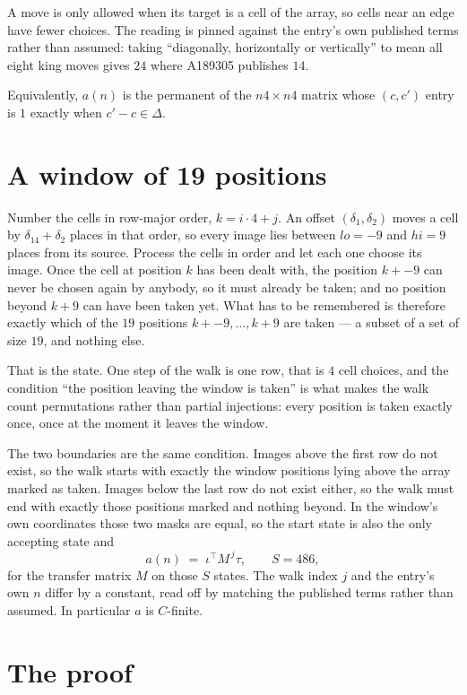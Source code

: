 \documentclass[11pt,a4paper]{article}
\theoremstyle{plain}
\theoremstyle{definition}
\begin{document}
A move is only allowed when its target is a cell of the array, so cells near an
edge have fewer choices. The reading is pinned against the entry's own published terms rather
than assumed: taking ``diagonally, horizontally or vertically'' to mean all eight king moves
gives $24$ where A189305 publishes $14$.

Equivalently, $a(n)$ is the permanent of the $n4\times n4$ matrix whose $(c,c')$ entry is
$1$ exactly when $c'-c\in\Delta$.

\section{A window of 19 positions}

Number the cells in row-major order, $k=i\cdot4+j$. An offset $(\delta_1,\delta_2)$ moves a
cell by $\delta_14+\delta_2$ places in that order, so every image lies between $lo=-9$ and
$hi=9$ places from its source. Process the cells in order and let each one choose its image.
Once the cell at position $k$ has been dealt with, the position $k+-9$ can never be chosen
again by anybody, so it must already be taken; and no position beyond $k+9$ can have been
taken yet. What has to be remembered is therefore exactly which of the $19$ positions
$k+-9,\dots,k+9$ are taken --- a subset of a set of size $19$, and nothing else.

That is the state. One step of the walk is one row, that is $4$ cell choices, and the
condition ``the position leaving the window is taken'' is what makes the walk count permutations
rather than partial injections: every position is taken exactly once, once at the moment it
leaves the window.

The two boundaries are the same condition. Images above the first row do not exist, so the walk
starts with exactly the window positions lying above the array marked as taken. Images below the
last row do not exist either, so the walk must end with exactly those positions marked and
nothing beyond. In the window's own coordinates those two masks are equal, so the start state is
also the only accepting state and
\[
a(n)\;=\;\iota^{\!\top}M^{\,j}\tau ,\qquad S=486,
\]
for the transfer matrix $M$ on those $S$ states. The walk index $j$ and the entry's own $n$
differ by a constant, read off by matching the published terms rather than assumed. In
particular $a$ is $C$-finite.

\section{The proof}
\end{document}
